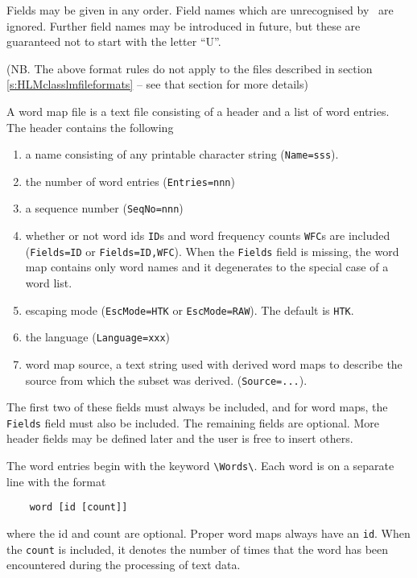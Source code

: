 Fields may be given in any order.  Field names which are unrecognised
by \HTK\ are ignored.  Further field names may be introduced in
future, but these are guaranteed not to start with the letter ``U''.

(NB. The above format rules do not apply to the files described in section
\ref{s:HLMclasslmfileformats} -- see that section for more details)



A word map file is a text file consisting of a header and a list of
word entries.  The header contains the
following
\begin{enumerate}

\item a name consisting of any printable character string 
      (\texttt{Name=sss}).

\item the number of word entries (\texttt{Entries=nnn})

\item a sequence number (\texttt{SeqNo=nnn})

\item whether or not word ids \texttt{ID}s and word frequency counts 
      \texttt{WFC}s are included (\texttt{Fields=ID} or
      \texttt{Fields=ID,WFC}).  When the \texttt{Fields} field is
      missing, the word map contains only word names and it
      degenerates to the special case of a word list.

\item escaping mode (\texttt{EscMode=HTK} or \texttt{EscMode=RAW}). 
      The default is \texttt{HTK}.

\item the language (\texttt{Language=xxx})

\item word map source, a text string used with derived word maps
      to describe the source from which the subset was derived.
      (\texttt{Source=...}).

\end{enumerate}
The first two of these fields must always be included, and for word
maps, the \texttt{Fields} field must also be included.  The remaining
fields are optional.  More header fields may be defined later and the
user is free to insert others.

The word entries begin with the keyword \verb+\Words\+.  Each word is
on a separate line with the format
\begin{verbatim}
    word [id [count]]
\end{verbatim}
where the id and count are optional. Proper word maps always have an
\texttt{id}.  When the \texttt{count} is included, it denotes the
number of times that the word has been encountered during the
processing of text data.

